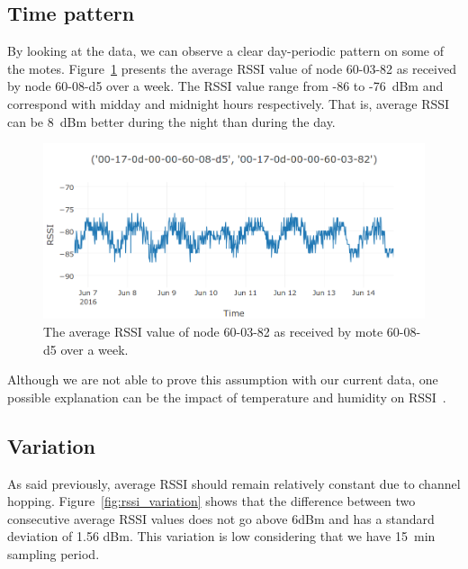 \documentclass{sig-alternate}
\begin{document}
\subsection{Time pattern}

By looking at the data, we can observe a clear day-periodic pattern on some of the motes.
Figure~\ref{fig:periodic_rssi} presents the average RSSI value of node 60-03-82 as received by node 60-08-d5 over a week.
The RSSI value range from -86 to -76~dBm and correspond with midday and midnight hours respectively.
That is, average RSSI can be 8~dBm better during the night than during the day.

\begin{figure}
    \centering
    \includegraphics[width=\columnwidth]{periodic_rssi}
    \caption{The average RSSI value of node 60-03-82 as received by mote 60-08-d5 over a week.}
    \label{fig:periodic_rssi}
\end{figure}

Although we are not able to prove this assumption with our current data, one possible explanation can be the impact of temperature and humidity on RSSI~\cite{luomala15effects}.

\subsection{Variation}

As said previously, average RSSI should remain relatively constant due to channel hopping.
Figure~\ref{fig:rssi_variation} shows that the difference between two consecutive average RSSI values does not go above 6dBm and has a standard deviation of 1.56 dBm.
This variation is low considering that we have 15~min sampling period.
\end{document}
